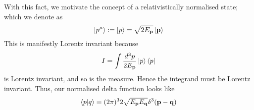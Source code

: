 With this fact, we motivate the concept of a relativistically normalised state; which we denote as 
\[ 	
\ket{ p^\mu }  : = \ket{ p } = \sqrt{ 2 E_{\mathbf{  p  }} } \ket{ \mathbf{  p  } } 
\] This is manifestly Lorentz invariant because  
\[ 
I = \int \frac { d^3 p }{ 2 E_{\mathbf{ p }} } \ket{ p }\bra{p } 
\] is Lorentz invariant, and so is the measure. Hence the integrand must be Lorentz invariant. Thus, our normalised delta function looks like 
\[ 
\bra{ p}\ket{ q} = ( 2 \pi )^3 2 \sqrt{ E_{\mathbf{  p }} E_{\mathbf{  q }} } \delta^3 ( \mathbf{  p - q } ) 
\] 

\pagebreak
